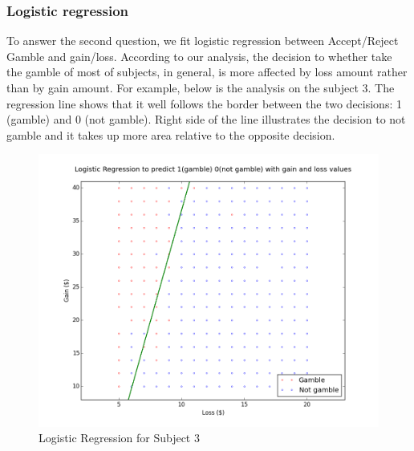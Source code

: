 \subsubsection {Logistic regression}
\noindent
To answer the second question, we fit logistic regression between Accept/Reject
Gamble and gain/loss. According to our analysis, the decision to whether take 
the gamble of most of subjects, in general, is more affected by loss amount 
rather than by gain amount.  For example, below is the analysis on the subject 
3. The regression line shows that it well follows the border between the two 
decisions: 1 (gamble) and 0 (not gamble). Right side of the line illustrates 
the decision to not gamble and it takes up more area relative to the opposite 
decision.
\begin{figure}[H]
    \centering
        \includegraphics[scale=0.5]{../plots/log_regression.png}
    \caption{Logistic Regression for Subject 3}
\end{figure}




